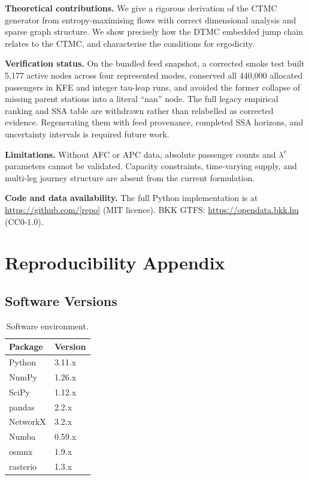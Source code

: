 \documentclass[11pt,a4paper]{article}
\theoremstyle{plain}
\theoremstyle{definition}
\theoremstyle{remark}
\begin{document}
\textbf{Theoretical contributions.}  We give a rigorous derivation of the
CTMC generator from entropy-maximising flows with correct dimensional analysis
and sparse graph structure.  We show precisely how the DTMC embedded jump chain
relates to the CTMC, and characterise the conditions for ergodicity.

\textbf{Verification status.}  On the bundled feed snapshot, a corrected
smoke test built 5,177 active nodes across four represented modes, conserved
all 440,000 allocated passengers in KFE and integer tau-leap runs, and avoided
the former collapse of missing parent stations into a literal ``nan'' node.
The full legacy empirical ranking and SSA table are withdrawn rather than
relabelled as corrected evidence.  Regenerating them with feed provenance,
completed SSA horizons, and uncertainty intervals is required future work.

\textbf{Limitations.}  Without AFC or APC data, absolute passenger counts and
$\lambda^v$ parameters cannot be validated.  Capacity constraints, time-varying
supply, and multi-leg journey structure are absent from the current formulation.

\textbf{Code and data availability.}  The full Python implementation is at
\url{https://github.com/[repo]} (MIT licence).  BKK GTFS:
\url{https://opendata.bkk.hu} (CC0-1.0).

\appendix
\section{Reproducibility Appendix}

\subsection{Software Versions}

\begin{table}[h]
\centering
\caption{Software environment.}
\begin{tabular}{ll}
\toprule
Package & Version \\
\midrule
Python    & 3.11.x \\
NumPy     & 1.26.x \\
SciPy     & 1.12.x \\
pandas    & 2.2.x  \\
NetworkX  & 3.2.x  \\
Numba     & 0.59.x \\
osmnx     & 1.9.x  \\
rasterio  & 1.3.x  \\
\bottomrule
\end{tabular}
\end{table}
\end{document}

